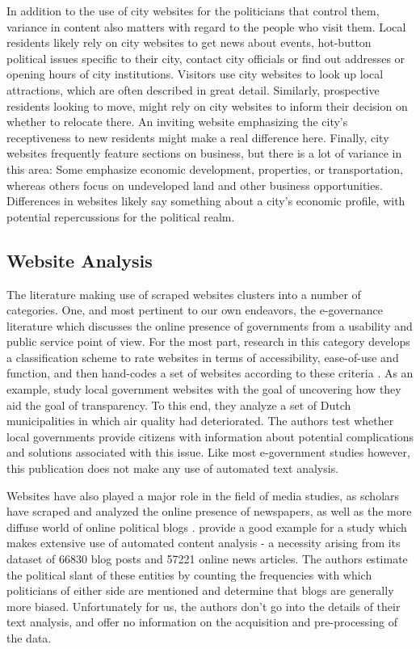 \documentclass[11pt]{article}
\begin{document}
In addition to the use of city websites for the politicians that control them, variance in content also matters  with regard to the people who visit them. Local residents likely rely on city websites to get news about events, hot-button political issues specific to their city, contact city officials or find out addresses or opening hours of city institutions. Visitors use city websites to look up local attractions, which are often described in great detail. Similarly, prospective residents looking to move, might rely on city websites to inform their decision on whether to relocate there. An inviting website emphasizing the city's receptiveness to new residents might make a real difference here. Finally, city websites frequently feature sections on business, but there is a lot of variance in this area: Some emphasize economic development, properties, or transportation, whereas others focus on undeveloped land and other business opportunities. Differences in websites likely say something about a city's economic profile, with potential repercussions for the political realm.

\subsection*{Website Analysis}
The literature making use of scraped websites clusters into a number of categories. One, and most pertinent to our own endeavors, the e-governance literature which discusses the online presence of governments from a usability and public service point of view. For the most part, research in this category develops a classification scheme to rate websites in terms of accessibility, ease-of-use and function, and then hand-codes a set of websites according to these criteria \citep{Urban2002,Armstrong2011,Feeney2017}. As an example, \cite{grimmelikhuijsen2012developing} study local government websites with the goal of uncovering how they aid the goal of transparency. To this end, they analyze a set of Dutch municipalities in which air quality had deteriorated. The authors test whether local governments provide citizens with information about potential complications and solutions associated with this issue. Like most e-government studies however, this publication does not make any use of automated text analysis.

Websites have also played a major role in the field of media studies, as scholars have scraped and analyzed the online presence of newspapers, as well as the more diffuse world of online political blogs \citep{Adamic2005,Gentzkow2010}. \cite{Lin2011} provide a good example for a study which makes extensive use of automated content analysis - a necessity arising from its dataset of 66830 blog posts and 57221 online news articles. The authors estimate the political slant of these entities by counting the frequencies with which politicians of either side are mentioned and determine that blogs are generally more biased. Unfortunately for us, the authors don't go into the details of their text analysis, and offer no information on the acquisition and pre-processing of the data.
\end{document}
